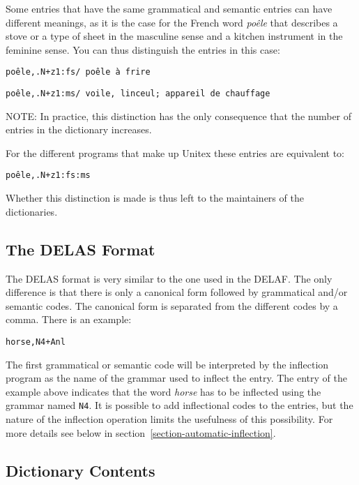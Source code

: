 \bigskip 
\noindent Some entries that have the same grammatical and semantic entries can
have different meanings, as it is the case for the French word \textit{po\^ele}
that describes a stove or a type of sheet in the masculine sense and a kitchen
instrument in the feminine sense. You can thus distinguish the entries in  this
case:

\bigskip
\noindent
\texttt{po\^ele,.N+z1:fs/ po\^ele \`a frire}

\noindent
\texttt{po\^ele,.N+z1:ms/ voile, linceul; appareil de chauffage}

\bigskip 
\noindent NOTE: In practice, this distinction has the only consequence that the
number of entries in the dictionary increases.

\bigskip 
\noindent For the different programs that make up Unitex these entries are equivalent to:

\bigskip
\noindent
\texttt{po\^ele,.N+z1:fs:ms}

\bigskip 
\noindent Whether this distinction is made is thus left to the  maintainers of  the dictionaries.


\subsection{The DELAS Format}
\label{section-DELAS-format}

The DELAS format is very similar to the one used in the DELAF. The only
difference is that there is only a canonical form followed by grammatical
and/or semantic codes. The canonical form is separated from the different codes
by a comma. There is an example: \index{\verbc{,}}

\begin{verbatim}
horse,N4+Anl
\end{verbatim}

\noindent The first grammatical or semantic code will be interpreted by the
inflection program as the name of the grammar used to inflect the entry. The entry of the
example above indicates that the word \textit{horse} has to be inflected using
the grammar named \verb+N4+. It is possible to add inflectional codes to the
entries, but the nature of the inflection operation limits the usefulness of this
possibility. For more details see below in
section~\ref{section-automatic-inflection}.


\subsection{Dictionary Contents}

